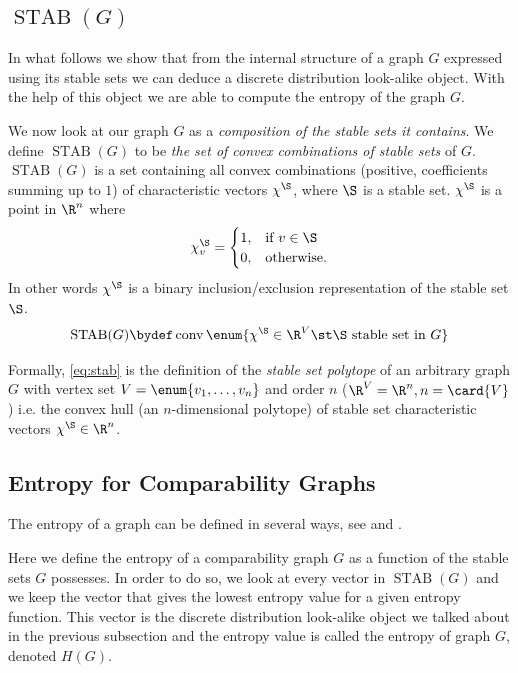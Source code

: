 \subsection{$\operatorname{STAB}(G)$}
\label{tree:poset:graph:stab}

In what follows we show that from the internal structure of a graph $G$
expressed using its stable sets we can deduce a discrete distribution
look-alike object. With the help of this object we are able to compute the
entropy of the graph $G$.

We now look at our graph $G$ as a \emph{composition of the
stable sets it contains}. We define $\operatorname{STAB}(G)$ to be \emph{the set of convex
combinations of stable sets} of $G$.
$\operatorname{STAB}(G)$ is a set containing all convex combinations (positive,
coefficients summing up to $1$) of characteristic vectors $\chi^{\S}$, where $\S$
is a stable set. $\chi^{\S}$ is a point in $\R^n$ where
\begin{displaymath}
\chi^{\S}_v =\begin{cases}
      1, & \text{if}\ v \in \S\\
      0, & \text{otherwise}.
    \end{cases}
\end{displaymath}
In other words $\chi^{\S}$ is a binary inclusion/exclusion representation of the
stable set $\S$.
\begin{equation}
\operatorname{STAB}(G) \bydef \operatorname{conv}\enum{\chi^{\S} \in \R^V \st
\S\text{ stable set in }G}
\label{eq:stab}
\end{equation}

Formally, \ref{eq:stab} is the definition of the \emph{stable set polytope} of
an arbitrary graph $G$ with vertex set $V = \enum{v_1, \ldots, v_n }$
and order $n$ ($\R^V = \R^n, n = \card{V}$) i.e. the convex hull (an $n$-dimensional
polytope) of stable set characteristic vectors $\chi^{\S} \in \R^n$.



\subsection{Entropy for Comparability Graphs}

The entropy of a graph can be defined in several ways, see
\citet*{mowshowitz2012entropy} and \citet*{simonyi1995graph}.

Here we define the entropy of a comparability graph $G$ as a function of the
stable sets $G$ possesses. In order to do so, we look at every vector in
$\operatorname{STAB}(G)$ and we keep the vector that gives the lowest entropy
value for a given entropy function. This vector is the discrete distribution
look-alike object we talked about in the previous subsection and the
entropy value is called the entropy of graph $G$, denoted ${H}(G)$.

